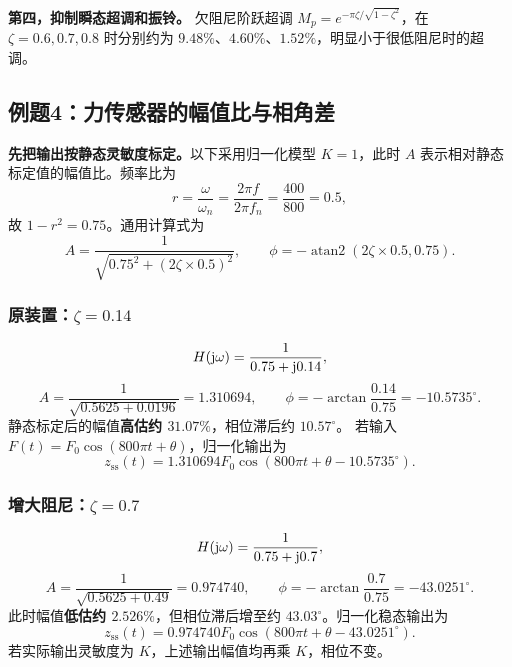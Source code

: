 \textbf{第四，抑制瞬态超调和振铃。}
欠阻尼阶跃超调 $M_p=e^{-\pi\zeta/\sqrt{1-\zeta^2}}$，在
$\zeta=0.6,0.7,0.8$ 时分别约为 $9.48\%$、$4.60\%$、$1.52\%$，明显小于很低阻尼时的超调。


\Needspace{8cm}
\subsection{例题4：力传感器的幅值比与相角差}


\sol
\textbf{先把输出按静态灵敏度标定。}以下采用归一化模型 $K=1$，此时 $A$ 表示相对静态标定值的幅值比。频率比为
\[
r=\frac{\omega}{\omega_n}=\frac{2\pi f}{2\pi f_n}
=\frac{400}{800}=0.5,
\]
故 $1-r^2=0.75$。通用计算式为
\[
A=\frac{1}{\sqrt{0.75^2+(2\zeta\times0.5)^2}},\qquad
\phi=-\operatorname{atan2}(2\zeta\times0.5,0.75).
\]

\subsubsection{原装置：$\zeta=0.14$}
\[
H(\mathrm{j}\omega)=\frac{1}{0.75+\mathrm{j}0.14},
\]
\[
\boxed{A=\frac{1}{\sqrt{0.5625+0.0196}}=1.310694},\qquad
\boxed{\phi=-\arctan\frac{0.14}{0.75}=-10.5735^\circ}.
\]
静态标定后的幅值\textbf{高估约 $31.07\%$}，相位滞后约 $10.57^\circ$。
若输入 $F(t)=F_0\cos(800\pi t+\theta)$，归一化输出为
\[
z_{\mathrm{ss}}(t)=1.310694F_0\cos(800\pi t+\theta-10.5735^\circ).
\]

\subsubsection{增大阻尼：$\zeta=0.7$}
\[
H(\mathrm{j}\omega)=\frac{1}{0.75+\mathrm{j}0.7},
\]
\[
\boxed{A=\frac{1}{\sqrt{0.5625+0.49}}=0.974740},\qquad
\boxed{\phi=-\arctan\frac{0.7}{0.75}=-43.0251^\circ}.
\]
此时幅值\textbf{低估约 $2.526\%$}，但相位滞后增至约 $43.03^\circ$。归一化稳态输出为
\[
z_{\mathrm{ss}}(t)=0.974740F_0\cos(800\pi t+\theta-43.0251^\circ).
\]
若实际输出灵敏度为 $K$，上述输出幅值均再乘 $K$，相位不变。

